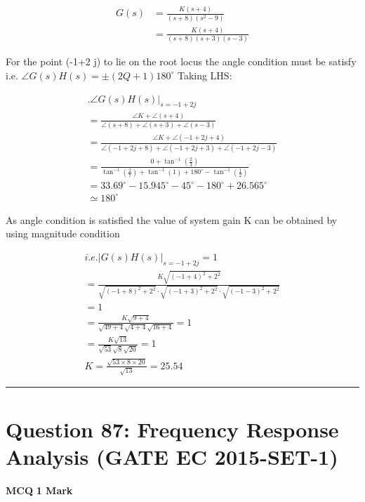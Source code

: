 \documentclass[11pt,a4paper]{article}
\begin{document}
\begin{tcolorbox}[solbox, title=Detailed Solution -- Question 86]
\[
\begin{aligned} G(s) &=\frac{K(s+4)}{(s+8)\left(s^{2}-9\right)} \\ &=\frac{K(s+4)}{(s+8)(s+3)(s-3)} \end{aligned}
\]

 For the point (-1+2 j) to lie on the root locus the angle condition must be satisfy 
 i.e. $\angle G(s) H(s)=\pm(2 Q+1) 180^{\circ}$
 Taking LHS:

\[
\begin{array}{l} .\angle G(s) H(s)|_{s=-1+2 j} \\ =\frac{\angle K+\angle(s+4)}{\angle(s+8)+\angle(s+3)+\angle(s-3)} \\ =\frac{\angle K+\angle(-1+2 j+4)}{\angle(-1+2 j+8)+\angle(-1+2 j+3)+\angle(-1+2 j-3)} \\ =\frac{0+\tan ^{-1}(\frac{2}{3})}{\tan ^{-1}(\frac{2}{7})+\tan ^{-1}(1)+180^{\circ}-\tan ^{-1}(\frac{1}{2})} \\ =33.69^{\circ}-15.945^{\circ}-45^{\circ}-180^{\circ}+26.565^{\circ} \\ \simeq 180^{\circ} \end{array}
\]

As angle condition is satisfied the value of system gain K can be obtained by using magnitude
 condition

\[
\begin{array}{l} i.e. |G(s) H(s)|_{s=-1+2 j}=1 \\ =\frac{K \sqrt{(-1+4)^{2}+2^{2}}}{\sqrt{(-1+8)^{2}+2^{2}} \cdot \sqrt{(-1+3)^{2}+2^{2}} \cdot \sqrt{(-1-3)^{2}+2^{2}}} \\ =1 \\ =\frac{K \sqrt{9+4}}{\sqrt{49+4} \sqrt{4+4} \sqrt{16+4}}=1 \\ =\frac{K \sqrt{13}}{\sqrt{53} \sqrt{8} \sqrt{20}}=1 \\ K=\frac{\sqrt{53 \times 8 \times 20}}{\sqrt{13}}=25.54 \end{array}
\]
\end{tcolorbox}

\vspace{1.5em}
\hrule
\vspace{1.5em}

\section*{Question 87: Frequency Response Analysis (GATE EC 2015-SET-1)}
\noindent \textbf{\color{primary}MCQ} \hfill \textbf{\color{secondary}1 Mark}
\end{document}
